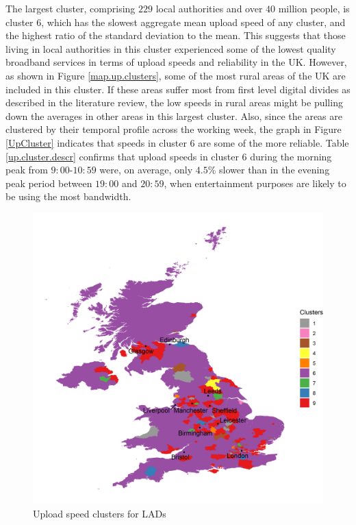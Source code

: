 \documentclass[]{interact}
\theoremstyle{plain}%
\theoremstyle{definition}
\theoremstyle{remark}
\begin{document}
The largest cluster, comprising \(229\) local authorities and over
\(40\) million people, is cluster \(6\), which has the slowest aggregate
mean upload speed of any cluster, and the highest ratio of the standard
deviation to the mean. This suggests that those living in local
authorities in this cluster experienced some of the lowest quality
broadband services in terms of upload speeds and reliability in the UK.
However, as shown in Figure \ref{map.up.clusters}, some of the most
rural areas of the UK are included in this cluster. If these areas
suffer most from first level digital divides as described in the
literature review, the low speeds in rural areas might be pulling down
the averages in other areas in this largest cluster. Also, since the
areas are clustered by their temporal profile across the working week,
the graph in Figure \ref{UpCluster} indicates that speeds in cluster
\(6\) are some of the more reliable. Table \ref{up.cluster.descr}
confirms that upload speeds in cluster \(6\) during the morning peak
from \(9:00\)-\(10:59\) were, on average, only \(4.5\)\% slower than in
the evening peak period between \(19:00\) and \(20:59\), when
entertainment purposes are likely to be using the most bandwidth.

\begin{figure}
\includegraphics[width=0.95\linewidth]{figures/map.up.clusters} \caption{\label{map.up.clusters}Upload speed clusters for LADs}\label{fig:unnamed-chunk-4}
\end{figure}
\end{document}
